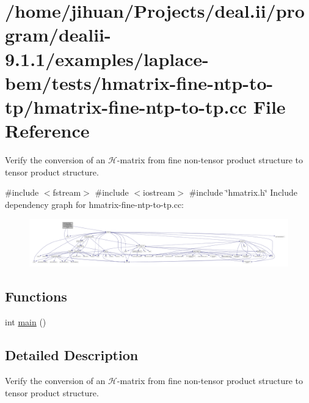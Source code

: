 \hypertarget{hmatrix-fine-ntp-to-tp_8cc}{}\section{/home/jihuan/\+Projects/deal.ii/program/dealii-\/9.1.1/examples/laplace-\/bem/tests/hmatrix-\/fine-\/ntp-\/to-\/tp/hmatrix-\/fine-\/ntp-\/to-\/tp.cc File Reference}
\label{hmatrix-fine-ntp-to-tp_8cc}


Verify the conversion of an $\mathcal{H}$-\/matrix from fine non-\/tensor product structure to tensor product structure.  


{\ttfamily \#include $<$fstream$>$}\newline
{\ttfamily \#include $<$iostream$>$}\newline
{\ttfamily \#include \char`\"{}hmatrix.\+h\char`\"{}}\newline
Include dependency graph for hmatrix-\/fine-\/ntp-\/to-\/tp.cc\+:\nopagebreak
\begin{figure}[H]
\begin{center}
\leavevmode
\includegraphics[width=350pt]{hmatrix-fine-ntp-to-tp_8cc__incl}
\end{center}
\end{figure}
\subsection*{Functions}
\begin{DoxyCompactItemize}
\item 
int \hyperlink{hmatrix-fine-ntp-to-tp_8cc_ae66f6b31b5ad750f1fe042a706a4e3d4}{main} ()
\end{DoxyCompactItemize}


\subsection{Detailed Description}
Verify the conversion of an $\mathcal{H}$-\/matrix from fine non-\/tensor product structure to tensor product structure. 

